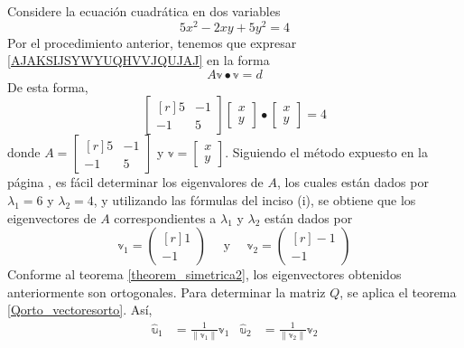 \begin{example}\label{Example:elipse}
    Considere la ecuación cuadrática en dos variables
    \begin{equation}
        5x^2 - 2xy + 5y^2 = 4 \label{AJAKSIJSYWYUQHVVJQUJAJ}
    \end{equation}
    Por el procedimiento anterior, tenemos que expresar \eqref{AJAKSIJSYWYUQHVVJQUJAJ} en la forma
    \begin{equation}
        A\mathbb{v} \bullet \mathbb{v} = d \label{IAJAJAJAJAHAHHHJQJ}
    \end{equation}
    De esta forma,
    $$\begin{bmatrix*}[r] 5 & -1 \\ -1 & 5 \end{bmatrix*} \begin{bmatrix} x \\ y \end{bmatrix} \bullet \begin{bmatrix} x \\ y \end{bmatrix} = 4$$
    donde $A = \begin{bmatrix*}[r] 5 & -1 \\ -1 & 5 \end{bmatrix*}$ y $\mathbb{v} = \begin{bmatrix} x \\ y \end{bmatrix}$. Siguiendo el método expuesto en la página \pageref{metodo_eigen_2x2}, es fácil determinar los eigenvalores de $A$, los cuales están dados por $\lambda_1 = 6$ y $\lambda_2 = 4$, y utilizando las fórmulas del inciso (i), se obtiene que los eigenvectores de $A$ correspondientes a $\lambda_1$ y $\lambda_2$ están dados por
    $$\mathbb{v}_1 = \begin{pmatrix*}[r] 1 \\ -1 \end{pmatrix*} \quad \text{ y } \quad \mathbb{v}_2 = \begin{pmatrix*}[r] -1 \\ -1 \end{pmatrix*}$$\newpage\noindent
    Conforme al teorema \ref{theorem_simetrica2}, los eigenvectores obtenidos anteriormente son ortogonales. Para determinar la matriz $Q$, se aplica el teorema \ref{Qorto_vectoresorto}. Así,
    \begin{align*}
        \hat{\mathbb{u}}_1 & = \frac{1}{\| \mathbb{v}_1 \|} \mathbb{v}_1 & \hat{\mathbb{u}}_2 & = \frac{1}{\| \mathbb{v}_2 \|} \mathbb{v}_2 \\

\end{align*}
\end{example}
